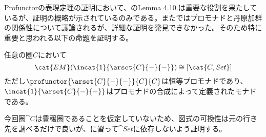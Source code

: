 \documentclass[uplatex,dvipdfmx]{jsarticle}
\begin{document}
  Profunctorの表現定理の証明において、\cite{profunctor_optics_update}のLemma 4.10.は重要な役割を果たしているが、証明の概略が示されているのみである。また\cite{doubles_for_monoidal}ではプロモナドと丹原加群の関係性について議論されるが、詳細な証明を発見できなかった。そのため特に重要と思われる以下の命題を証明する。
  \begin{prop}[EM圏による関手圏の表現]\label{prop-representation-of-functor-category-as-em}
    任意の圏$C$において\[\cat{EM}(\incat{1}{\arset{C}{-}{-}})\cong[\cat{C,Set}]\]
    ただし$\profunctor{\arset{C}{-}{-}}{C}{C}$は恒等プロモナドであり、$\incat{1}{\arset{C}{-}{-}}$はプロモナドの合成によって定義されたモナドである。
  \end{prop}
  今回圏$\cat{C}$は豊穣圏であることを仮定していないため、図式の可換性は元の行き先を調べるだけで良いが、\cite{profunctor_optics_update}\cite{doubles_for_monoidal}に習って$\cat{Set}$に依存しないよう証明する。
\end{document}
